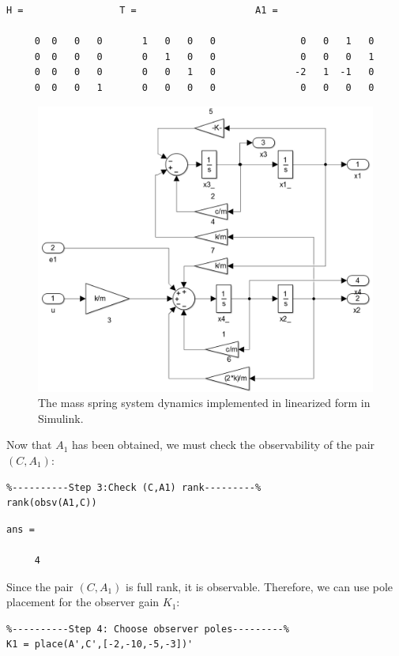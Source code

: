 \documentclass{amsart}
\theoremstyle{definition}
\theoremstyle{remark}
\numberwithin{equation}{section}
\begin{document}
        \color{lightgray} \begin{verbatim}
H =                 T =                     A1 =

     0  0   0   0       1   0   0   0               0   0   1   0
     0  0   0   0       0   1   0   0               0   0   0   1
     0  0   0   0       0   0   1   0              -2   1  -1   0
     0  0   0   1       0   0   0   0               0   0   0   0

\end{verbatim} \color{black}
\begin{figure}[H]
    \centering
    \includegraphics[scale=.45]{msDynSim.png}
    \caption{The mass spring system dynamics implemented in linearized form in Simulink.}
    \label{fig:msDynSim}
\end{figure}

Now that $A_1$ has been obtained, we must check the observability of the pair $(C,A_1)$:
    \begin{verbatim}
%----------Step 3:Check (C,A1) rank---------%
rank(obsv(A1,C))
\end{verbatim}
        \color{lightgray} \begin{verbatim}
ans =

     4

\end{verbatim} \color{black}
Since the pair $(C,A_1)$ is full rank, it is observable.  Therefore, we can use pole placement for the observer gain $K_1$:
    \begin{verbatim}
%----------Step 4: Choose observer poles---------%
K1 = place(A',C',[-2,-10,-5,-3])'
\end{verbatim}
\end{document}
